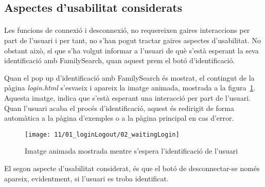\subsection{Aspectes d'usabilitat considerats}

    \paragraph{}
    Les funcions de connexió i desconnexió, no requereixen gaires interaccions per part de l'usuari i per tant, no s'han pogut tractar gaires aspectes d'usabilitat. No obstant això, sí que s'ha volgut informar a l'usuari de què s'està esperant la seva identificació amb FamilySearch, quan aquest prem el botó d'identificació.

    Quan el pop up d'identificació amb FamilySearch és mostrat, el contingut de la pàgina \emph{login.html} s'esvaeix i apareix la imatge animada, mostrada a la figura~\ref{fig:fsLoginWait}. Aquesta imatge, indica que s'està esperant una interacció per part de l'usuari. Quan l'usuari acaba el procés d'identificació, aquest és redirigit de forma automàtica a la pàgina d'exemples o a la pàgina principal en cas d'error.

    \begin{figure}[h]
        \texttt{[image: 11/01\_loginLogout/02\_waitingLogin]}
        \centering
        \caption{Imatge animada mostrada mentre s'espera l'identificació de l'usuari}\label{fig:fsLoginWait}
    \end{figure}

    El segon aspecte d'usabilitat considerat, és que el botó de desconnectar-se només apareix, evidentment, si l'usuari es troba identificat.
